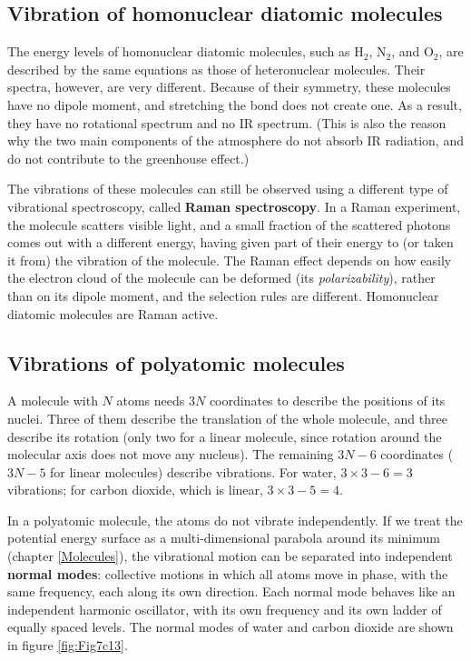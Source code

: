 \documentclass[
  english,
  9pt,
]{extbook}
\theoremstyle{definition}
\theoremstyle{definition}
\theoremstyle{definition}
\theoremstyle{definition}
\theoremstyle{remark}
\begin{document}
\subsection{Vibration of homonuclear diatomic molecules}\label{vibration-of-homonuclear-diatomic-molecules}

The energy levels of homonuclear diatomic molecules, such as \(\mathrm{H}_2\), \(\mathrm{N}_2\), and \(\mathrm{O}_2\), are described by the same equations as those of heteronuclear molecules. Their spectra, however, are very different. Because of their symmetry, these molecules have no dipole moment, and stretching the bond does not create one. As a result, they have no rotational spectrum and no IR spectrum. (This is also the reason why the two main components of the atmosphere do not absorb IR radiation, and do not contribute to the greenhouse effect.)

The vibrations of these molecules can still be observed using a different type of vibrational spectroscopy, called \textbf{Raman spectroscopy}. In a Raman experiment, the molecule scatters visible light, and a small fraction of the scattered photons comes out with a different energy, having given part of their energy to (or taken it from) the vibration of the molecule. The Raman effect depends on how easily the electron cloud of the molecule can be deformed (its \emph{polarizability}), rather than on its dipole moment, and the selection rules are different. Homonuclear diatomic molecules are Raman active.

\subsection{Vibrations of polyatomic molecules}\label{vibrations-of-polyatomic-molecules}

A molecule with \(N\) atoms needs \(3N\) coordinates to describe the positions of its nuclei. Three of them describe the translation of the whole molecule, and three describe its rotation (only two for a linear molecule, since rotation around the molecular axis does not move any nucleus). The remaining \textbf{\(3N-6\)} coordinates (\(3N-5\) for linear molecules) describe vibrations. For water, \(3\times3-6=3\) vibrations; for carbon dioxide, which is linear, \(3\times3-5=4\).

In a polyatomic molecule, the atoms do not vibrate independently. If we treat the potential energy surface as a multi-dimensional parabola around its minimum (chapter \ref{Molecules}), the vibrational motion can be separated into independent \textbf{normal modes}: collective motions in which all atoms move in phase, with the same frequency, each along its own direction. Each normal mode behaves like an independent harmonic oscillator, with its own frequency and its own ladder of equally spaced levels. The normal modes of water and carbon dioxide are shown in figure \ref{fig:Fig7c13}.
\end{document}
